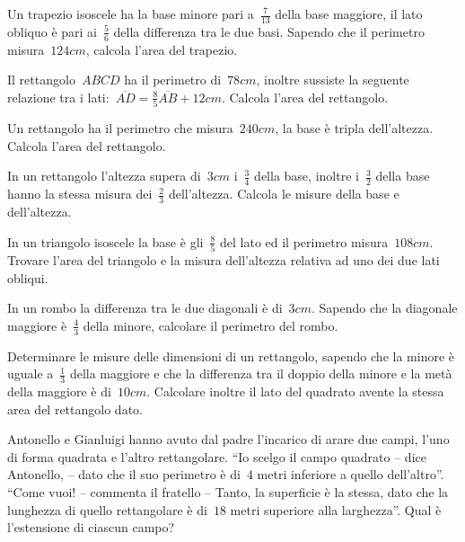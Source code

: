 \begin{multicols}{2}
\begin{esercizio}[\Ast]
Un trapezio isoscele ha la base minore pari a~$\frac{7}{13}$ della base maggiore, il lato obliquo è pari ai~$\frac{5}{6}$ della differenza tra le due basi. Sapendo che il perimetro misura~$124\unit{cm}$, calcola l'area del trapezio.
\end{esercizio}

\begin{esercizio}[\Ast]
Il rettangolo~$ABCD$ ha il perimetro di~$78\unit{cm}$, inoltre sussiste la seguente relazione tra i lati:~$\overline{AD}=\frac{8}{5}\overline{AB}+12\unit{cm}$. Calcola l'area del rettangolo.
\end{esercizio}

\begin{esercizio}[\Ast]
Un rettangolo ha il perimetro che misura~$240\unit{cm}$, la base è tripla dell'altezza. Calcola l'area del rettangolo.
\end{esercizio}

\begin{esercizio}[\Ast]
In un rettangolo l'altezza supera di~$3\unit{cm}$ i~$\frac{3}{4}$ della base, inoltre i~$\frac{3}{2}$ della base hanno la stessa misura dei~$\frac{2}{3}$ dell'altezza. Calcola le misure della base e dell'altezza.
\end{esercizio}

\begin{esercizio}[\Ast]
In un triangolo isoscele la base è gli~$\frac{8}{5}$ del lato ed il perimetro misura~$108\unit{cm}$. Trovare l'area del triangolo e la misura dell'altezza relativa ad uno dei due lati obliqui.
\end{esercizio}

\begin{esercizio}[\Ast]
In un rombo la differenza tra le due diagonali è di~$3\unit{cm}$. Sapendo che la diagonale maggiore è~$\frac{4}{3}$ della minore, calcolare il perimetro del rombo.
\end{esercizio}

\begin{esercizio}[\Ast]
Determinare le misure delle dimensioni di un rettangolo, sapendo che la minore è uguale a~$\frac{1}{3}$ della maggiore e che la differenza tra il doppio della minore e la metà della maggiore è di~$10\unit{cm}$. Calcolare inoltre il lato del quadrato avente la stessa area del rettangolo dato.
\end{esercizio}

\begin{esercizio}[\Ast]
Antonello e Gianluigi hanno avuto dal padre l'incarico di arare due campi, l'uno di forma quadrata e l'altro rettangolare. ``Io scelgo il campo quadrato -- dice Antonello, -- dato che il suo perimetro è di~$4$ metri inferiore a quello dell'altro''. ``Come vuoi! -- commenta il fratello -- Tanto, la superficie è la stessa, dato che la lunghezza di quello rettangolare è di~$18$ metri superiore alla larghezza''. Qual è l'estensione di ciascun campo?
\end{esercizio}


\end{multicols}
